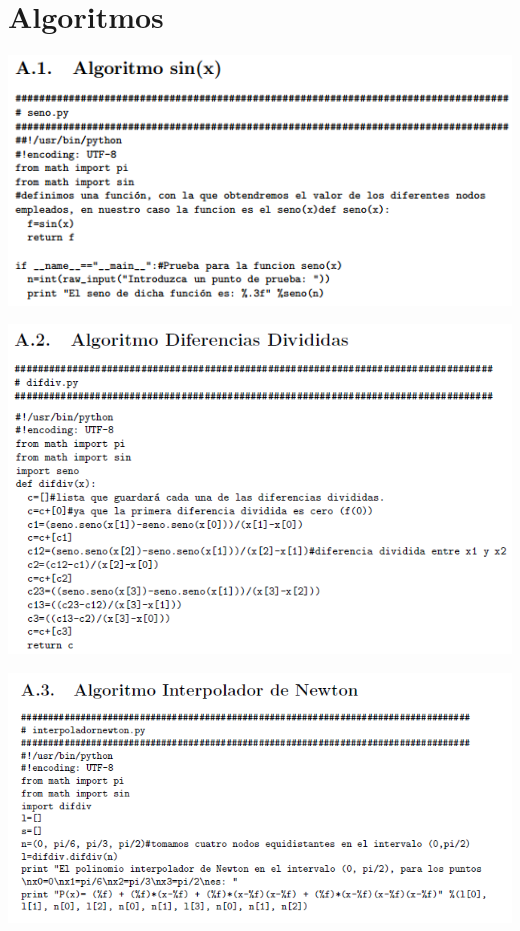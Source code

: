 \documentclass{beamer}
\begin{document}
\section{Algoritmos}
\begin{frame}
  \includegraphics[width=1.0\textwidth]{img/Algoritmo1}
\end{frame}
\begin{frame}
  \includegraphics[width=1.0\textwidth]{img/Algoritmo2}
\end{frame}
\begin{frame}
  \includegraphics[width=1.0\textwidth]{img/Algoritmo3}
\end{frame}
\end{document}
